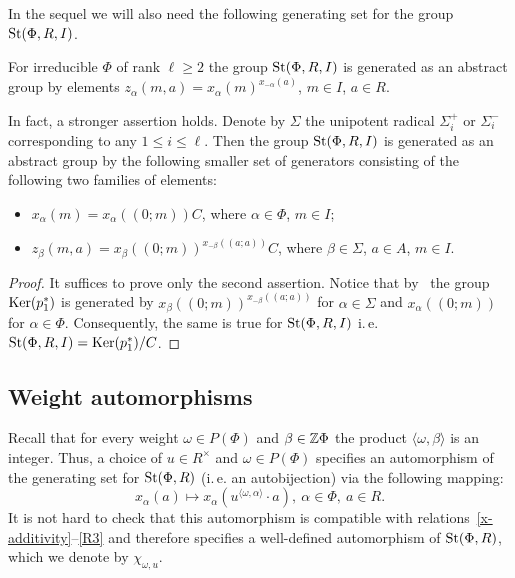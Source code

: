 In the sequel we will also need the following generating set for the group $\operatorname{St}(\Phi, R, I)$.
\begin{lemma}\label{lem:relative-generators}
    For irreducible $\Phi$ of rank $\ell \geq 2$ the group $\operatorname{St}(\Phi, R, I)$ is generated as an abstract group by elements $z_\alpha(m, a) = x_\alpha(m)^{x_{-\alpha}(a)}$, $m \in I$, $a \in R$.

    In fact, a stronger assertion holds.
    Denote by $\Sigma$ the unipotent radical $\Sigma^+_i$ or $\Sigma^-_i$ corresponding to any $1 \leq i \leq \ell$.
    Then the group $\operatorname{St}(\Phi, R, I)$ is generated as an abstract group by the following smaller set of generators consisting of the following two families of elements:
    \begin{itemize}
        \item $x_{\alpha}(m) = x_\alpha((0; m))C$, where $\alpha \in \Phi$, $m \in I$;
        \item $z_{\beta}(m, a) = x_\beta((0; m))^{x_{-\beta}((a; a))}C$, where $\beta \in \Sigma$, $a \in A$, $m \in I$.
    \end{itemize}
\end{lemma}
\begin{proof}
    It suffices to prove only the second assertion.
    Notice that by~\cite[Lemma~4]{S15} the group $\operatorname{Ker}(p_1^*)$ is generated by $x_{\beta}((0; m))^{x_{-\beta}((a; a))}$ for $\alpha \in \Sigma$ and $x_{\alpha}((0; m))$ for $\alpha \in \Phi$.
    Consequently, the same is true for $\operatorname{St}(\Phi, R, I)$ i.\,e. $\operatorname{St}(\Phi, R, I) = \operatorname{Ker}(p_1^*)/C$.
\end{proof}

\subsection{Weight automorphisms}\label{subsec:weight-automorphisms}
Recall that for every weight $\omega \in P(\Phi)$ and $\beta \in \mathbb{Z} \Phi$ the product $\langle \omega, \beta\rangle$ is an integer.
Thus, a choice of $u \in R^\times$ and $\omega \in P(\Phi)$ specifies an automorphism of the generating set for $\operatorname{St}(\Phi, R)$ (i.\,e. an autobijection) via the following mapping:
\begin{equation*} x_\alpha(a) \mapsto x_\alpha(u^{\langle\omega, \alpha\rangle} \cdot a),\ \alpha\in \Phi,\ a \in R. \end{equation*}
It is not hard to check that this automorphism is compatible with relations~\eqref{x-additivity}--\eqref{R3} and therefore specifies a well-defined automorphism of $\operatorname{St}(\Phi, R)$, which we denote by $\chi_{\omega, u}$.


